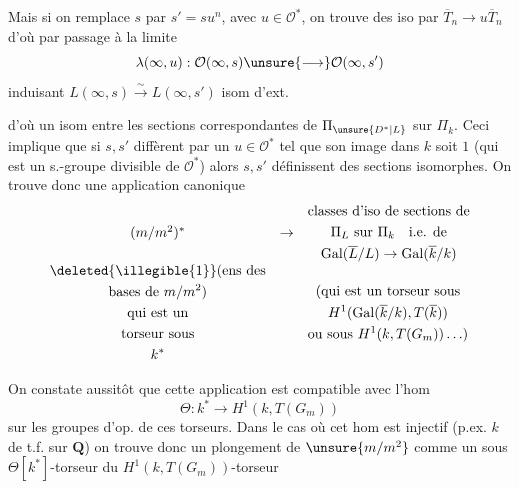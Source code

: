Mais si on remplace $s$ par $s'=su^n$, avec $u\in\mathcal{O}^*$, on trouve des iso
par $\overline{T}_n\to u\overline{T}_n$
d'où par passage à la limite
\[
\lambda(\infty,u):\mathcal{O}(\infty,s)\unsure{\longrightarrow}\mathcal{O}(\infty,s')
\]
induisant $L(\infty,s)\xrightarrow{\sim}L(\infty,s')$ isom d'ext.



d'où un isom entre les sections correspondantes de $\Pi_{\unsure{D^*|L}}$ sur $\Pi_k$.
Ceci implique que si $s,s'$ diffèrent par un $u\in\mathcal{O}^*$ tel que son image dans $k$ soit $1$   (qui est un s.-groupe divisible de $\mathcal{O}^*$\unsure{]|)}) alors $s,s'$ définissent des sections isomorphes.
On trouve donc une application canonique
\[
\begin{array}{ccl}
(m/m^2)^* & \to &
\begin{gathered}
\text{classes d'iso de sections de}\\
\Pi_L\text{ sur }\Pi_k\quad\text{i.e. de}\\
\operatorname{Gal}(\overline{L}/L)\to\operatorname{Gal}(\overline{k}/k)
\end{gathered}
\\[1ex]
\begin{gathered}
\deleted{\illegible{1}}\text{(ens des}\\
\text{bases de }m/m^2\text{)}\\
\text{qui est un}\\
\text{torseur sous}\\ k^*
\end{gathered}
&&
\begin{gathered}
\text{(qui est un torseur sous}\\
H^1(\operatorname{Gal}(\overline{k}/k),T(\overline{k}))\\
\text{ou sous }H^1(k,T(G_m))\ldots)
\end{gathered}
\end{array}
\]

On constate aussitôt que cette application est compatible avec l'hom
\[
\Theta:k^*\to H^1(k,T(G_m))
\]
sur les groupes d'op. de ces torseurs.
Dans le cas où cet hom est injectif (p.ex. $k$  de t.f. sur $\mathbf{Q}$) on trouve donc un plongement de $\unsure{m/m^2}$ comme un sous $\Theta[k^*]$-torseur du $H^1(k,T(G_m))$-torseur

